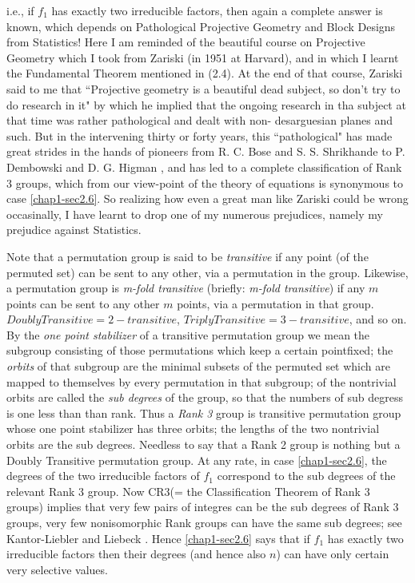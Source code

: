 i.e., if $f_{1}$ has exactly two irreducible factors, then again a complete answer is known, which depends on Pathological Projective Geometry and Block Designs from Statistics! Here I am reminded of the beautiful course on Projective Geometry which I took from Zariski (in 1951 at Harvard), and in which I learnt the Fundamental Theorem mentioned in (2.4). At the end of that course, Zariski said to me that ``Projective geometry is a beautiful dead subject, so don't try to do research in it" by which he implied that the ongoing research in tha subject at that time was rather pathological and dealt with non- desarguesian planes and such. But in the intervening thirty or forty years, this ``pathological" has made great strides in the hands of pioneers from R. C. Bose \cite{chap1-key21} and S. S. Shrikhande \cite{chap1-key58} to P. Dembowski \cite{chap1-key29} and D. G. Higman \cite{chap1-key34}, and has led to a complete classification of Rank 3 groups, which from our view-point of the theory of equations is synonymous to case \eqref{chap1-sec2.6}. So realizing how even a great man like Zariski could be wrong occasinally, I have learnt to drop one of my numerous prejudices, namely my prejudice against Statistics.  

Note that a permutation group is said to be {\it transitive} if any point (of the permuted set) can be sent to any other, via a permutation in the group. Likewise, a permutation group is {\it m-fold transitive} (briefly: {\it m-fold transitive}) if any $m$ points can be sent to any other $m$ points, via a permutation in that group. $Doubly Transitive = 2-transitive$, $Triply Transitive = 3-transitive$, and so on. By the {\it one point stabilizer} of a transitive permutation group we mean the subgroup consisting of those permutations which keep a certain point\pageoriginale fixed; the {\it orbits} of that subgroup are the minimal subsets of the permuted set which are mapped to themselves by every permutation in that subgroup; of the nontrivial orbits are called the {\it sub degrees} of the group, so that the numbers of sub degress is one less than than rank. Thus a {\it Rank 3} group is transitive permutation group whose one point stabilizer has three orbits; the lengths of the two nontrivial orbits are the sub degrees. Needless to say that a Rank 2 group is nothing but a Doubly Transitive permutation group. At any rate, in case \eqref{chap1-sec2.6}, the degrees of the two irreducible factors of $f_{1}$ correspond to the sub degrees of the relevant Rank 3 group. Now CR3(= the Classification Theorem of Rank 3 groups) implies that very few pairs of integres can be the sub degrees  of Rank 3 groups, very few nonisomorphic Rank groups can have the same sub degrees; see Kantor-Liebler \cite{chap1-key42} and Liebeck \cite{chap1-key44}. Hence \eqref{chap1-sec2.6} says that if $f_{1}$ has exactly two irreducible factors then their degrees (and hence also $n$) can have only certain very selective values.

